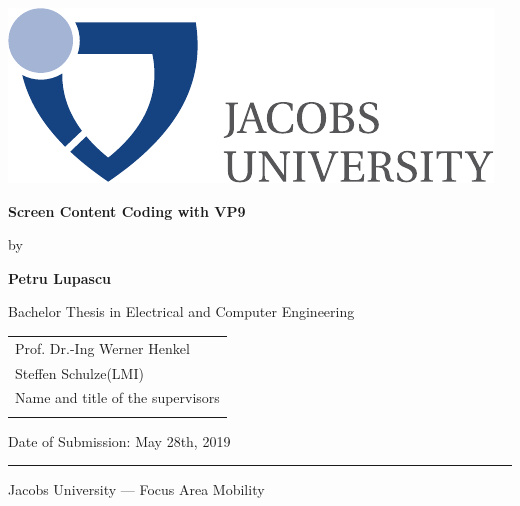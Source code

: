 \documentclass[a4paper,11pt,oneside]{article}
\newcommand{\myname}{Petru Lupascu}
\newcommand{\mytitle}{Screen Content Coding with VP9}
\newcommand{\mysupervisor}{Prof. Dr.-Ing Werner Henkel}
\newcommand{\myssupervisor}{Steffen Schulze(LMI)}
\begin{document}

\thispagestyle{empty}

\begin{flushright}
  \includegraphics[scale=0.7]{../figures/bsc-logo.pdf}
\end{flushright}
\vspace{20mm}
\begin{center}
  \huge
  \textbf{\mytitle}
\end{center}
\vspace*{4mm}
\begin{center}
  \Large by
\end{center}
\vspace*{4mm}
\begin{center}
  \Large
  \textbf{\myname}
\end{center}
\vspace*{20mm}
\begin{center}
  \large
  Bachelor Thesis in Electrical and Computer Engineering
\end{center}
\vfill
\begin{flushright}
  \large
  \begin{tabular}{l}
    \mysupervisor                     \\
    \myssupervisor                    \\
    \hline
    Name and title of the supervisors \\
    \\
  \end{tabular}
\end{flushright}
\vspace*{8mm}
\begin{flushleft}
  \large
  Date of Submission: May 28th, 2019 \\
  \rule{\textwidth}{1pt}
\end{flushleft}
\begin{center}
  \Large Jacobs University --- Focus Area Mobility
\end{center}

\iffalse
\end{document}
